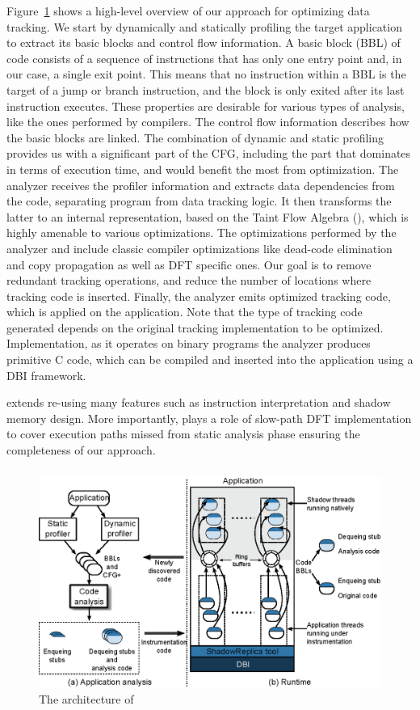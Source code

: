 Figure~\ref{fig:approach_overview} shows a high-level overview of our approach
for optimizing data tracking. We start by dynamically and statically profiling
the target application to extract its basic blocks and control flow
information. A basic block (BBL) of code consists of a sequence of instructions
that has only one entry point and, in our case, a single exit point. This means
that no instruction within a BBL is the target of a jump or branch instruction,
and the block is only exited after its last instruction executes. These
properties are desirable for various types of analysis, like the ones performed
by compilers. The control flow information describes how the basic blocks are
linked. The combination of dynamic and static profiling provides us with a
significant part of the CFG, including the part that dominates in terms of
execution time, and would benefit the most from optimization.
%
The analyzer receives the profiler information and extracts data dependencies
from the code, separating program from data tracking logic. It then transforms
the latter to an internal representation, based on the Taint Flow Algebra
(\tfa), which is highly amenable to various optimizations. The optimizations
performed by the analyzer and include classic compiler optimizations like
dead-code elimination and copy propagation as well as DFT specific ones. Our
goal is to remove redundant tracking operations, and reduce the number of
locations where tracking code is inserted. 
%
Finally, the analyzer emits optimized tracking code, which is applied on the
application. Note that the type of tracking code generated depends on the
original tracking implementation to be optimized. Implementation, as it
operates on binary programs the analyzer produces primitive C code, which can
be compiled and inserted into the application using a DBI framework.

\tfa extends \libdft re-using many features such as instruction interpretation
and shadow memory design. More importantly, \libdft plays a role of slow-path
DFT implementation to cover execution paths missed from static analysis phase
ensuring the completeness of our approach.
 
\subsubsection{\sreplica}

\begin{figure}[tb]
    \centering
    \includegraphics[width=0.64\linewidth]{figs/architecture.eps}
    \caption{The architecture of \sreplica \label{fig:approach_overview}}
\end{figure}

